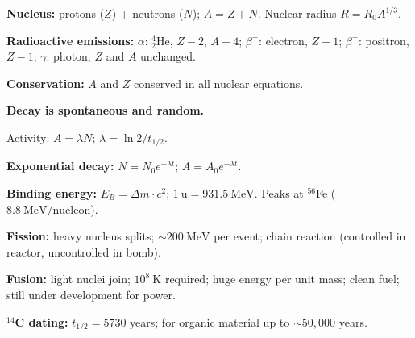 \begin{summarybox}
\textbf{Nucleus:} protons ($Z$) + neutrons ($N$);
$A = Z + N$. Nuclear radius $R = R_0 A^{1/3}$.

\textbf{Radioactive emissions:}
$\alpha$: ${}^4_2\text{He}$, $Z-2$, $A-4$;
$\beta^-$: electron, $Z+1$; $\beta^+$: positron, $Z-1$;
$\gamma$: photon, $Z$ and $A$ unchanged.

\textbf{Conservation:} $A$ and $Z$ conserved in all
nuclear equations.

\textbf{Decay is spontaneous and random.}

Activity: $A = \lambda N$;
$\lambda = \ln 2/t_{1/2}$.

\textbf{Exponential decay:}
$N = N_0 e^{-\lambda t}$; $A = A_0 e^{-\lambda t}$.

\textbf{Binding energy:}
$E_B = \Delta m \cdot c^2$; $1\ \text{u} = 931.5\ \text{MeV}$.
Peaks at ${}^{56}$Fe ($8.8\ \text{MeV/nucleon}$).

\textbf{Fission:} heavy nucleus splits;
$\sim 200\ \text{MeV}$ per event; chain reaction
(controlled in reactor, uncontrolled in bomb).

\textbf{Fusion:} light nuclei join; $10^8\ \text{K}$
required; huge energy per unit mass; clean fuel;
still under development for power.

\textbf{${}^{14}$C dating:} $t_{1/2} = 5730$ years;
for organic material up to $\sim 50{,}000$ years.
\end{summarybox}

